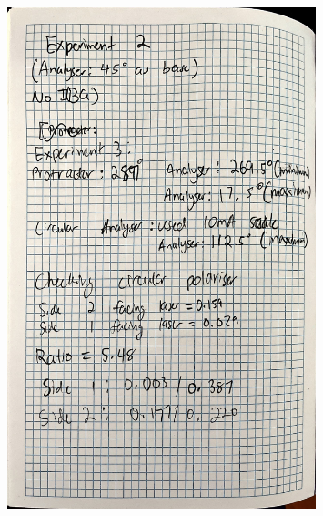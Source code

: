 \documentclass{article}
\begin{document}
\begin{figure}[H]
    \centering
    \includegraphics[width=0.8\textwidth]{labbook2.jpg}
\end{figure}
\end{document}
